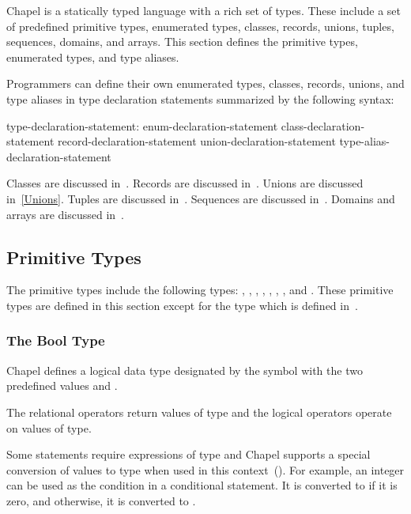 \label{Types}

Chapel is a statically typed language with a rich set of types.  These
include a set of predefined primitive types, enumerated types,
classes, records, unions, tuples, sequences, domains, and arrays.
This section defines the primitive types, enumerated types, and type
aliases.

Programmers can define their own enumerated types, classes, records,
unions, and type aliases in type declaration statements summarized by
the following syntax:
\begin{syntax}
type-declaration-statement:
  enum-declaration-statement
  class-declaration-statement
  record-declaration-statement
  union-declaration-statement
  type-alias-declaration-statement
\end{syntax}

Classes are discussed in~.  Records are discussed
in~.  Unions are discussed in~\ref{Unions}.  Tuples are
discussed in~.  Sequences are discussed
in~.  Domains and arrays are discussed
in~.


\subsection{Primitive Types}
\label{Primitive_Types}

The primitive types include the following
types: , , , ,
, , , and .
These primitive types are defined in this section except for
the  type which is defined in~.

\subsubsection{The Bool Type}
\label{The_Bool_Type}

Chapel defines a logical data type designated by the symbol
 with the two predefined values  and
.

The relational operators return values of  type and the
logical operators operate on values of  type.

Some statements require expressions of  type and Chapel
supports a special conversion of values to  type when used
in this context~().
For example, an integer can be used as the condition in a conditional
statement.  It is converted to  if it is zero, and
otherwise, it is converted to .

